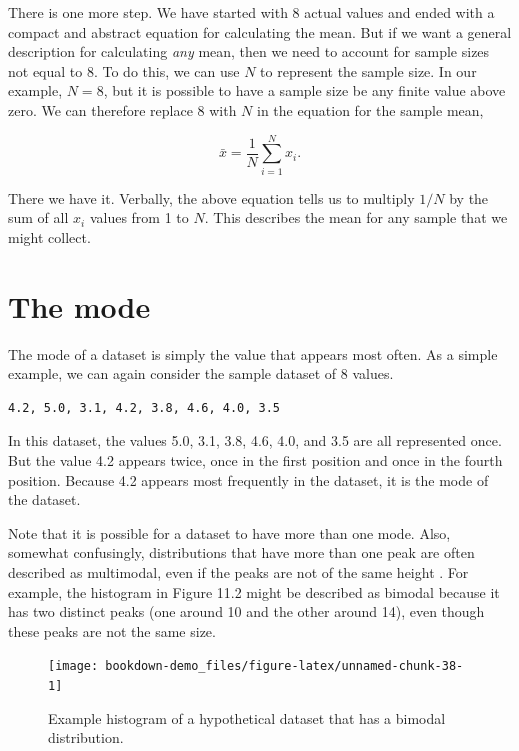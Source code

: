 \documentclass[
  openany]{scrbook}
\begin{document}
There is one more step.
We have started with 8 actual values and ended with a compact and abstract equation for calculating the mean.
But if we want a general description for calculating \emph{any} mean, then we need to account for sample sizes not equal to 8.
To do this, we can use \(N\) to represent the sample size.
In our example, \(N = 8\), but it is possible to have a sample size be any finite value above zero.
We can therefore replace 8 with \(N\) in the equation for the sample mean,

\[\bar{x} = \frac{1}{N}\sum_{i = 1}^{N}x_{i}.\]

There we have it.
Verbally, the above equation tells us to multiply \(1/N\) by the sum of all \(x_{i}\) values from 1 to \(N\).
This describes the mean for any sample that we might collect.

\hypertarget{the-mode}{%
\section{The mode}\label{the-mode}}

The mode of a dataset is simply the value that appears most often.
As a simple example, we can again consider the sample dataset of 8 values.

\begin{verbatim}
4.2, 5.0, 3.1, 4.2, 3.8, 4.6, 4.0, 3.5
\end{verbatim}

In this dataset, the values 5.0, 3.1, 3.8, 4.6, 4.0, and 3.5 are all represented once.
But the value 4.2 appears twice, once in the first position and once in the fourth position.
Because 4.2 appears most frequently in the dataset, it is the mode of the dataset.

Note that it is possible for a dataset to have more than one mode.
Also, somewhat confusingly, distributions that have more than one peak are often described as multimodal, even if the peaks are not of the same height \citep{Sokal1995}.
For example, the histogram in Figure 11.2 might be described as bimodal because it has two distinct peaks (one around 10 and the other around 14), even though these peaks are not the same size.

\begin{figure}
\texttt{[image: bookdown-demo\_files/figure-latex/unnamed-chunk-38-1]} \caption{Example histogram of a hypothetical dataset that has a bimodal distribution.}\label{fig:unnamed-chunk-38}
\end{figure}
\end{document}

